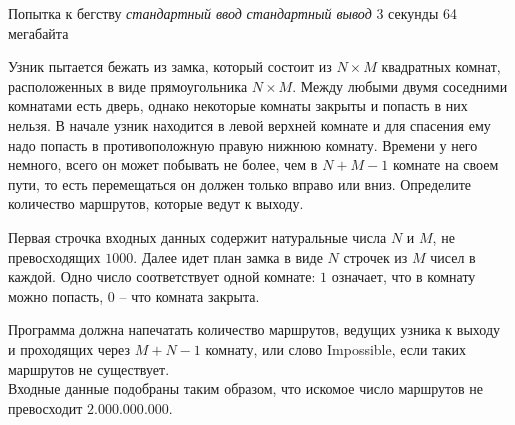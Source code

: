 \begin{problem}%
{Попытка к бегству}%
{\textsl{стандартный ввод}}%
{\textsl{стандартный вывод}}%
{3 секунды}%
{64 мегабайта}%
{}

Узник пытается бежать из замка, который состоит из $N \times M$ квадратных комнат, расположенных в виде прямоугольника $N \times M$. Между любыми двумя соседними комнатами есть дверь, однако некоторые комнаты закрыты и попасть в них нельзя. В начале узник находится в левой верхней комнате и для спасения ему надо попасть в противоположную правую нижнюю комнату. Времени у него немного, всего он может побывать не более, чем в $N+M-1$ комнате на своем пути, то есть перемещаться он должен только вправо или вниз. Определите количество маршрутов, которые ведут к выходу.

\InputFile

Первая строчка входных данных содержит натуральные числа $N$ и $M$, не превосходящих $1000$. Далее идет план замка в виде $N$ строчек из $M$ чисел в каждой. Одно число соответствует одной комнате: $1$ означает, что в комнату можно попасть, $0$ – что комната закрыта.

\OutputFile

Программа должна напечатать количество маршрутов, ведущих узника к выходу и проходящих через $M+N-1$ комнату, или слово Impossible, если таких маршрутов не существует. \\

Входные данные подобраны таким образом, что искомое число маршрутов не превосходит $2.000.000.000.$

\Examples

\begin{example}
%
\end{example}
\end{problem}

